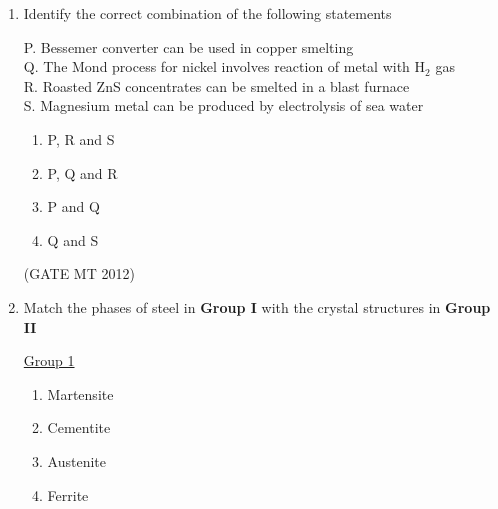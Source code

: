 \documentclass[journal, 11pt, onecolumn]{IEEEtran}
\theoremstyle{remark}
\begin{document}
\begin{enumerate}
\begin{multicols}{2}
\underline{Group 2}
\begin{enumerate}[label=(\arabic*), start=1]
\item Lead 
\item Copper
\item Aluminium
\item Gold
\end{enumerate}
\end{multicols}

\begin{multicols}{2}
\begin{enumerate}
\item P-1, Q-2, R-1, S-4
\item P-2, Q-3, R-1, S-4
\item P-2, Q-1, R-3, S-4
\item P-2, Q-3, R-4, S-1
\end{enumerate}
\end{multicols}
\hfill(GATE MT 2012)

\item Identify the correct combination of the following statements

P. Bessemer converter can be used in copper smelting \\
Q. The Mond process for nickel involves reaction of metal with H$_2$ gas \\
R. Roasted ZnS concentrates can be smelted in a blast furnace \\
S. Magnesium metal can be produced by electrolysis of sea water

\begin{multicols}{2}
\begin{enumerate}  
\item P, R and S
\item P, Q and R
\item P and Q
\item Q and S
\end{enumerate}
\end{multicols}
\hfill(GATE MT 2012)

\item Match the phases of steel in \textbf{Group I} with the crystal structures in \textbf{Group II}
\begin{multicols}{2}
\underline{Group 1}
\begin{enumerate}[label=(\Alph*), start=16]
\item Martensite   
\item Cementite
\item Austenite  
\item Ferrite
\end{enumerate}


\end{multicols}
\end{enumerate}
\end{document}
